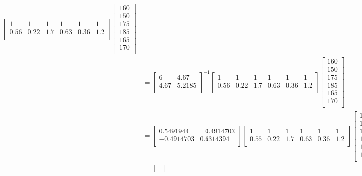 \documentclass[a4paper]{article}
\begin{document}
{\begin{enumerate}
\begin{align*}
\begin{bmatrix}
1 & 1 & 1 & 1 & 1 & 1 \\
0.56 & 0.22 & 1.7 & 0.63 & 0.36 &  1.2   \\
\end{bmatrix}
\begin{bmatrix}
160  \\
150  \\
175  \\
185  \\
165  \\
170  \\
\end{bmatrix} \\ &=
\begin{bmatrix}
6 & 4.67  \\
4.67 & 5.2185   \\
\end{bmatrix}^{-1}
\begin{bmatrix}
1 & 1 & 1 & 1 & 1 & 1 \\
0.56 & 0.22 & 1.7 & 0.63 & 0.36 &  1.2   \\
\end{bmatrix}
\begin{bmatrix}
160  \\
150  \\
175  \\
185  \\
165  \\
170  \\
\end{bmatrix} \\ &=
 \begin{bmatrix}
0.5491944 & -0.4914703  \\
-0.4914703  & 0.6314394   \\
\end{bmatrix}
\begin{bmatrix}
1 & 1 & 1 & 1 & 1 & 1 \\
0.56 & 0.22 & 1.7 & 0.63 & 0.36 &  1.2   \\
\end{bmatrix}
\begin{bmatrix}
160  \\
150  \\
175  \\
185  \\
165  \\
170  \\
\end{bmatrix} \\
&= \begin{bmatrix}

\end{bmatrix}
\end{align*}
\end{enumerate}}
\end{document}
